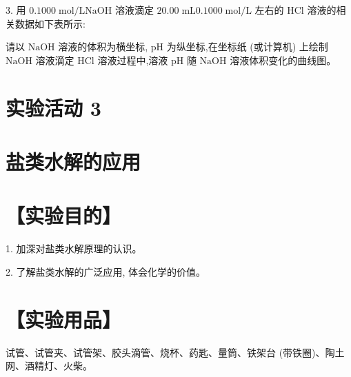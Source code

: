 \documentclass[10pt]{article}
\begin{document}
3. 用 \({0.1000}\mathrm{\;{mol}}/\mathrm{L}\mathrm{{NaOH}}\) 溶液滴定 \({20.00}\mathrm{\;{mL}}{0.1000}\mathrm{\;{mol}}/\mathrm{L}\) 左右的 \(\mathrm{{HCl}}\) 溶液的相关数据如下表所示:

\begin{center}
\end{center}

请以 \(\mathrm{{NaOH}}\) 溶液的体积为横坐标, \(\mathrm{{pH}}\) 为纵坐标,在坐标纸 (或计算机) 上绘制 \(\mathrm{{NaOH}}\) 溶液滴定 \(\mathrm{{HCl}}\) 溶液过程中,溶液 \(\mathrm{{pH}}\) 随 \(\mathrm{{NaOH}}\) 溶液体积变化的曲线图。

\section*{实验活动 3}

\section*{盐类水解的应用}

\section*{【实验目的】}

1. 加深对盐类水解原理的认识。

2. 了解盐类水解的广泛应用, 体会化学的价值。

\section*{【实验用品】}

试管、试管夹、试管架、胶头滴管、烧杯、药匙、量筒、铁架台 (带铁圈)、陶土网、酒精灯、火柴。
\end{document}
